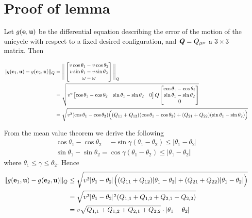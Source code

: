 \section{Proof of lemma }

Let $g(\bm{\mathbf{e}}, \bm{\mathbf{u}})$ be the differential equation describing the
error of the motion of the unicycle with respect to a fixed desired
configuration, and $\bm{\mathit{Q}} = Q_{\mu\nu}$ a $3 \times 3$ matrix. Then

\begin{align}
  \|g(\bm{\mathbf{e}}_1, \bm{\mathbf{u}}) - g(\bm{\mathbf{e}}_2, \bm{\mathbf{u}})\|_{Q} &=
  \Bigg\|
  \begin{bmatrix}
    v \cos\theta_1 - v \cos\theta_2 \\
    v \sin\theta_1 - v \sin\theta_2 \\
    \omega - \omega
  \end{bmatrix}
  \Bigg\|_Q \\
  &=\sqrt{v^2
   \begin{bmatrix}
     \cos\theta_1 - \cos\theta_2 & \sin\theta_1 - \sin\theta_2 & 0
   \end{bmatrix}
   Q
   \begin{bmatrix}
     \cos\theta_1 - \cos\theta_2 \\
     \sin\theta_1 - \sin\theta_2 \\
     0
   \end{bmatrix}
  }\\
  &= \sqrt{v^2 (\cos\theta_1 - \cos\theta_2)\Big( (Q_{11}+Q_{12})(\cos\theta_1 - \cos\theta_2) +
                    (Q_{21}+Q_{22})(\sin\theta_1 - \sin\theta_2)\Big)}
\end{align}

From the mean value theorem we derive the following
\begin{align}
  \cos\theta_1 - \cos\theta_2 = -\sin\gamma (\theta_1 - \theta_2) \leq |\theta_1 - \theta_2| \\
  \sin\theta_1 - \sin\theta_2 = \cos\gamma (\theta_1 - \theta_2) \leq |\theta_1 - \theta_2|
\end{align}
where $\theta_1 \leq \gamma \leq \theta_2$. Hence
\begin{align}
  \|g(\bm{\mathbf{e}}_1, \bm{\mathbf{u}}) - g(\bm{\mathbf{e}}_2, \bm{\mathbf{u}})\|_{Q} &\leq
    \sqrt{v^2 |\theta_1 - \theta_2|
      \Big( (Q_{11}+Q_{12}) |\theta_1 - \theta_2|+ (Q_{21}+Q_{22}) |\theta_1 - \theta_2|\Big)} \\
      &= \sqrt{v^2 |\theta_1 - \theta_2|^2 (Q_{1,1}+Q_{1,2}+Q_{2,1}+Q_{2,2})} \\
      &= v \sqrt{Q_{1,1}+Q_{1,2}+Q_{2,1}+Q_{2,2}} \cdot |\theta_1 - \theta_2|
\end{align}
